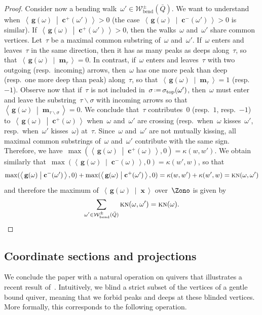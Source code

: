 \documentclass{amsart}
\theoremstyle{definition}
\renewcommand{\b}[1]{\mathbf{#1}} %
\newcommand{\ssm}{\smallsetminus} %
\newcommand{\dotprod}[2]{\left\langle \, #1 \; \middle| \; #2 \, \right\rangle} %
\newcommand{\eqdef}{\mbox{\,\raisebox{0.2ex}{\scriptsize\ensuremath{\mathrm:}}\ensuremath{=}\,}} %
\newcommand{\bendingWalks}{\mathcal{W}_\mathrm{bend}} %
\newcommand{\kn}{\kappa} %
\newcommand{\KN}{\textsc{kn}} %
\renewcommand{\top}{\mathrm{top}} %
\newcommand{\gvector}[1]{\mathbf{g}(#1)} %
\newcommand{\multiplicityVector}{\b{m}} %
\begin{document}
\begin{proof}
Consider now a bending walk~$\omega' \in \bendingWalks^\pm(\bar Q)$.
We want to understand when~$\dotprod{\gvector{\omega}}{\b{c}^+(\omega')} > 0$ (the case~$\dotprod{\gvector{\omega}}{\b{c}^-(\omega')} > 0$ is similar).
If~$\dotprod{\gvector{\omega}}{\b{c}^+(\omega')} > 0$, then the walks~$\omega$ and~$\omega'$ share common vertices.
Let~$\tau$ be a maximal common substring of~$\omega$ and~$\omega'$.
If~$\omega$ enters and leaves~$\tau$ in the same direction, then it has as many peaks as deeps along~$\tau$, so that~$\dotprod{\gvector{\omega}}{\multiplicityVector_{\tau}} = 0$.
In contrast, if~$\omega$ enters and leaves~$\tau$ with two outgoing (resp.~incoming) arrows, then~$\omega$ has one more peak than deep (resp.~one more deep than peak) along~$\tau$, so that~$\dotprod{\gvector{\omega}}{\multiplicityVector_{\tau}} = 1$ (resp.~$-1$).
Observe now that if~$\tau$ is not included in~$\sigma \eqdef \sigma_\top(\omega')$, then~$\omega$ must enter and leave the substring~$\tau \ssm \sigma$ with incoming arrows so that~$\dotprod{\gvector{\omega}}{\multiplicityVector_{\tau \ssm \sigma}} = 0$.
We conclude that~$\tau$ contributes~$0$ (resp.~$1$, resp.~$-1$) to~$\dotprod{\gvector{\omega}}{\b{c}^+(\omega)}$ when~$\omega$ and~$\omega'$ are crossing (resp.~when~$\omega$ kisses~$\omega'$, resp.~when~$\omega'$ kisses~$\omega$) at~$\tau$.
Since~$\omega$ and~$\omega'$ are not mutually kissing, all maximal common substrings of~$\omega$ and~$\omega'$ contribute with the same sign.
Therefore, we have~$\max(\dotprod{\gvector{\omega}}{\b{c}^+(\omega)}, 0) = \kn(w,w')$.
We obtain similarly that~$\max(\dotprod{\gvector{\omega}}{\b{c}^-(\omega)}, 0) = \kn(w',w)$, so that 
\[
\max(\dotprod{\gvector{\omega}}{\b{c}^-(\omega')},0) + \max(\dotprod{\gvector{\omega}}{\b{c}^+(\omega')},0) = \kn(w,w') + \kn(w',w) = \KN(\omega,\omega')
\]
and therefore the maximum of~$\dotprod{\gvector{\omega}}{\b{x}}$ over~$\Zono$ is given by
\[
\sum_{\substack{\omega' \in \bendingWalks^\pm(\bar Q)}} \KN(\omega,\omega') = \KN(\omega).
\qedhere
\]
\end{proof}


\subsection{Coordinate sections and projections}
\label{subsec:projections}

We conclude the paper with a natural operation on quivers that illustrates a recent result of~\cite{PilaudPlamondonStella}.
Intuitively, we blind a strict subset of the vertices of a gentle bound quiver, meaning that we forbid peaks and deeps at these blinded vertices.
More formally, this corresponds to the following operation.
\end{document}

